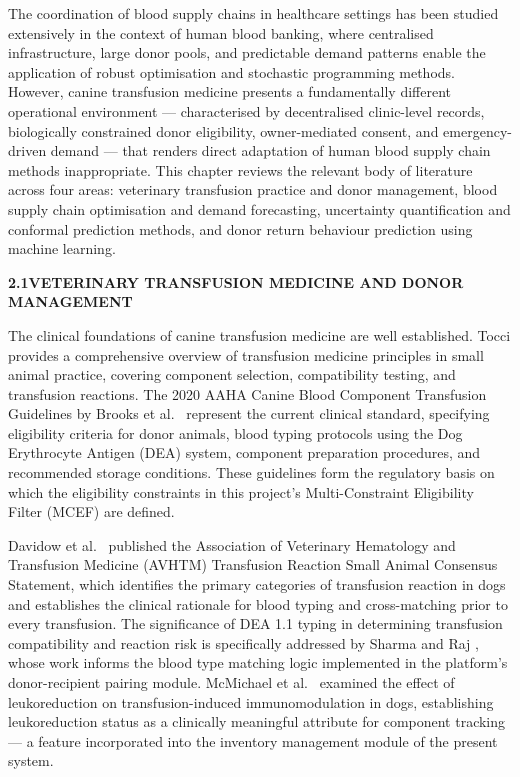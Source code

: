 \documentclass[12pt,a4paper]{article}
\begin{document}
\noindent The coordination of blood supply chains in healthcare settings has been studied extensively in the context of human blood banking, where centralised infrastructure, large donor pools, and predictable demand patterns enable the application of robust optimisation and stochastic programming methods. However, canine transfusion medicine presents a fundamentally different operational environment — characterised by decentralised clinic-level records, biologically constrained donor eligibility, owner-mediated consent, and emergency-driven demand — that renders direct adaptation of human blood supply chain methods inappropriate. This chapter reviews the relevant body of literature across four areas: veterinary transfusion practice and donor management, blood supply chain optimisation and demand forecasting, uncertainty quantification and conformal prediction methods, and donor return behaviour prediction using machine learning.

\vspace{2em}
\noindent\textbf{2.1\quad VETERINARY TRANSFUSION MEDICINE AND DONOR MANAGEMENT}
\vspace{0.8em}

\noindent The clinical foundations of canine transfusion medicine are well established. Tocci \cite{tocci2009} provides a comprehensive overview of transfusion medicine principles in small animal practice, covering component selection, compatibility testing, and transfusion reactions. The 2020 AAHA Canine Blood Component Transfusion Guidelines by Brooks et al.\ \cite{brooks2020} represent the current clinical standard, specifying eligibility criteria for donor animals, blood typing protocols using the Dog Erythrocyte Antigen (DEA) system, component preparation procedures, and recommended storage conditions. These guidelines form the regulatory basis on which the eligibility constraints in this project's Multi-Constraint Eligibility Filter (MCEF) are defined.

\noindent Davidow et al.\ \cite{davidow2013} published the Association of Veterinary Hematology and Transfusion Medicine (AVHTM) Transfusion Reaction Small Animal Consensus Statement, which identifies the primary categories of transfusion reaction in dogs and establishes the clinical rationale for blood typing and cross-matching prior to every transfusion. The significance of DEA 1.1 typing in determining transfusion compatibility and reaction risk is specifically addressed by Sharma and Raj \cite{sharma2014}, whose work informs the blood type matching logic implemented in the platform's donor-recipient pairing module. McMichael et al.\ \cite{mcmichael2009} examined the effect of leukoreduction on transfusion-induced immunomodulation in dogs, establishing leukoreduction status as a clinically meaningful attribute for component tracking — a feature incorporated into the inventory management module of the present system.
\end{document}
